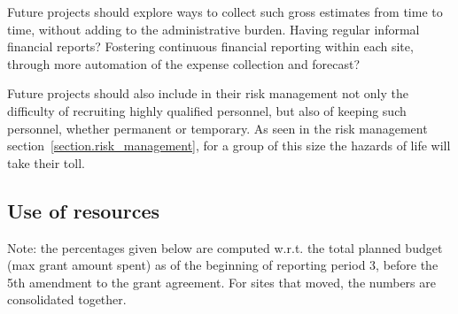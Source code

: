 Future projects should explore ways to collect such gross estimates
from time to time, without adding to the administrative burden. Having
regular informal financial reports? Fostering continuous financial
reporting within each site, through more automation of the expense
collection and forecast?

Future projects should also include in their risk management not only
the difficulty of recruiting highly qualified personnel, but also of
keeping such personnel, whether permanent or temporary. As seen in the
risk management section~\ref{section.risk_management}, for a group of this size
the hazards of life will take their toll.

\subsection{Use of resources}

Note: the percentages given below are computed w.r.t. the total
planned budget (max grant amount spent) as of the beginning of
reporting period 3, before the 5th amendment to the grant agreement.
For sites that moved, the numbers are consolidated together.

